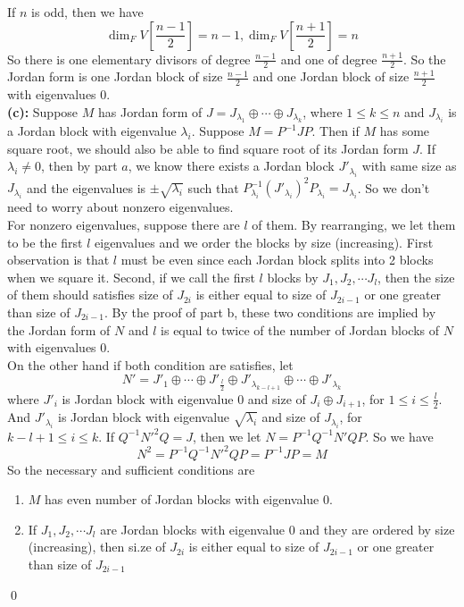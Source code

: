 \documentclass[12pt]{amsart}
\begin{document}
If $n$ is odd, then we have 
\[\dim_FV[\frac{n-1}{2}]=n-1,\dim_FV[\frac{n+1}{2}]=n\]
So there is one elementary divisors of degree $\frac{n-1}{2}$ and one of degree $\frac{n+1}{2}$. So the Jordan form is one Jordan block of size $\frac{n-1}{2}$ and one Jordan block of size $\frac{n+1}{2}$ with eigenvalues 0.\\
\textbf{(c):} Suppose $M$ has Jordan form of $J=J_{\lambda_1}\oplus \cdots \oplus J_{\lambda_k}$, where $1\leq k\leq n$ and $J_{\lambda_i}$ is a Jordan block with eigenvalue $\lambda_i$. Suppose $M=P^{-1}JP$. Then if $M$ has some square root, we should also be able to find square root of its Jordan form $J$. If $\lambda_i\neq 0$, then by part $a$, we know there exists a Jordan block $J'_{\lambda_i}$ with same size as $J_{\lambda_i}$ and the eigenvalues is $\pm\sqrt{\lambda_i}$ such that $P_{\lambda_i}^{-1}(J'_{\lambda_i})^2P_{\lambda_i}=J_{\lambda_i}$. So we don't need to worry about nonzero eigenvalues.\\
For nonzero eigenvalues, suppose there are $l$ of them. By rearranging, we let them to be the first $l$ eigenvalues and we order the blocks by size (increasing). First observation is that $l$ must be even since each Jordan block splits into 2 blocks when we square it. Second, if we call the first $l$ blocks by $J_1,J_2,\cdots J_l$, then the size of them should satisfies size of $J_{2i}$ is either equal to size of $J_{2i-1}$ or one greater than size of $J_{2i-1}$. By the proof of part b, these two conditions are implied by the Jordan form of $N$ and $l$ is equal to twice of the number of Jordan blocks of $N$ with eigenvalues 0.\\
On the other hand if both condition are satisfies, let 
\[N'=J'_1\oplus\cdots \oplus J'_{\frac{l}{2}}\oplus J'_{\lambda_{k-l+1}}\oplus \cdots \oplus J'_{\lambda_k}\]
where $J'_i$ is Jordan block with eigenvalue 0 and size of $J_i\oplus J_{i+1}$, for $1\leq i\leq \frac{l}{2}$. And $J'_{\lambda_i}$ is Jordan block with eigenvalue $\sqrt{\lambda_i}$ and size of $J_{\lambda_i}$, for $k-l+1\leq i\leq k$. If $Q^{-1}N'^2Q=J$, then we let $N=P^{-1}Q^{-1}N'QP$. So we have 
\[N^2=P^{-1}Q^{-1}N'^2QP=P^{-1}JP=M\]
So the necessary and sufficient conditions are 
\begin{enumerate}
    \item $M$ has even number of Jordan blocks with eigenvalue 0.\\
    \item If $J_1,J_2,\cdots J_l$ are Jordan blocks with eigenvalue 0 and they are ordered by size (increasing), then si.ze of $J_{2i}$ is either equal to size of $J_{2i-1}$ or one greater than size of $J_{2i-1}$
\end{enumerate}
\qed
\end{document}
